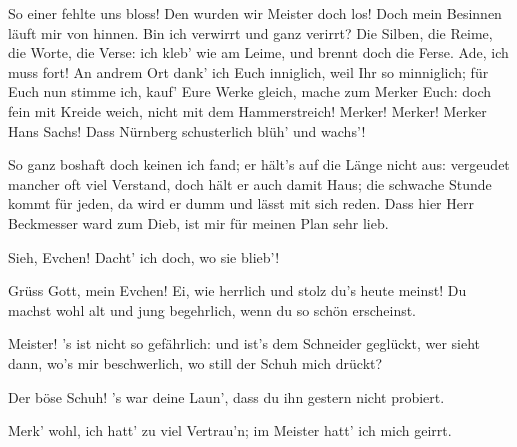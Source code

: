 \begin{drama}

So einer fehlte uns bloss!
Den wurden wir Meister doch los!
Doch mein Besinnen
läuft mir von hinnen.
Bin ich verwirrt
und ganz verirrt?
Die Silben, die Reime,
die Worte, die Verse:
ich kleb' wie am Leime,
und brennt doch die Ferse.
Ade, ich muss fort!
An andrem Ort
dank' ich Euch inniglich,
weil Ihr so minniglich;
für Euch nun stimme ich,
kauf' Eure Werke gleich,
mache zum Merker Euch:
doch fein mit Kreide weich,
nicht mit dem Hammerstreich!
Merker! Merker! Merker Hans Sachs!
Dass Nürnberg schusterlich blüh' und wachs'!


\Sachsspeaks


So ganz boshaft doch keinen ich fand;
er hält's auf die Länge nicht aus:
vergeudet mancher oft viel Verstand,
doch hält er auch damit Haus;
die schwache Stunde kommt für jeden,
da wird er dumm und lässt mit sich reden.
Dass hier Herr Beckmesser ward zum Dieb,
ist mir für meinen Plan sehr lieb.


Sieh, Evchen! Dacht' ich doch, wo sie blieb'!


\scene


\Sachsspeaks
Grüss Gott, mein Evchen! Ei, wie herrlich
und stolz du's heute meinst!
Du machst wohl alt und jung begehrlich,
wenn du so schön erscheinst.

\Evaspeaks
Meister! 's ist nicht so gefährlich:
und ist's dem Schneider geglückt,
wer sieht dann, wo's mir beschwerlich,
wo still der Schuh mich drückt?

\Sachsspeaks
Der böse Schuh! 's war deine Laun',
dass du ihn gestern nicht probiert.

\Evaspeaks
Merk' wohl, ich hatt' zu viel Vertrau'n;
im Meister hatt' ich mich geirrt.


\end{drama}
